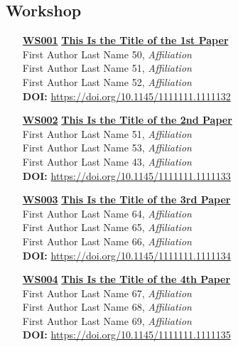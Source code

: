 \subsection{Workshop}
\begin{enumerate}
\item[\href{https://doi.org/10.1145/1111111.1111132}{\textbf{WS001}}]
\href{https://doi.org/10.1145/1111111.1111132}{\textbf{This Is the Title of the 1st Paper}}\\
First Author Last Name 50, \emph{Affiliation}\\
First Author Last Name 51, \emph{Affiliation}\\
First Author Last Name 52, \emph{Affiliation}\\
\textbf{DOI:} \href{https://doi.org/10.1145/1111111.1111132}{https://doi.org/10.1145/1111111.1111132}\\

\item[\href{https://doi.org/10.1145/1111111.1111133}{\textbf{WS002}}]
\href{https://doi.org/10.1145/1111111.1111133}{\textbf{This Is the Title of the 2nd Paper}}\\
First Author Last Name 51, \emph{Affiliation}\\
First Author Last Name 53, \emph{Affiliation}\\
First Author Last Name 43, \emph{Affiliation}\\
\textbf{DOI:} \href{https://doi.org/10.1145/1111111.1111133}{https://doi.org/10.1145/1111111.1111133}\\

\item[\href{https://doi.org/10.1145/1111111.1111134}{\textbf{WS003}}]
\href{https://doi.org/10.1145/1111111.1111134}{\textbf{This Is the Title of the 3rd Paper}}\\
First Author Last Name 64, \emph{Affiliation}\\
First Author Last Name 65, \emph{Affiliation}\\
First Author Last Name 66, \emph{Affiliation}\\
\textbf{DOI:} \href{https://doi.org/10.1145/1111111.1111134}{https://doi.org/10.1145/1111111.1111134}\\

\item[\href{https://doi.org/10.1145/1111111.1111135}{\textbf{WS004}}]
\href{https://doi.org/10.1145/1111111.1111135}{\textbf{This Is the Title of the 4th Paper}}\\
First Author Last Name 67, \emph{Affiliation}\\
First Author Last Name 68, \emph{Affiliation}\\
First Author Last Name 69, \emph{Affiliation}\\
\textbf{DOI:} \href{https://doi.org/10.1145/1111111.1111135}{https://doi.org/10.1145/1111111.1111135}\\
\end{enumerate}

